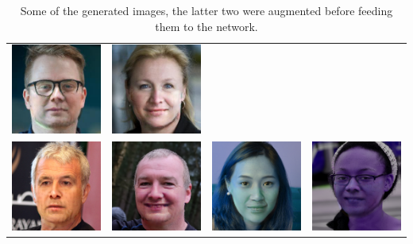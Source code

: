 \documentclass[10pt,twocolumn,letterpaper]{article}
\begin{document}
\begin{table}
\begin{tabular}{cccc}
    \includegraphics[width=.24\linewidth]{samples/00353.jpg}&
    \includegraphics[width=.24\linewidth]{samples/00708.jpg}\\
    \includegraphics[width=.24\linewidth]{samples/recon_600.png}&
    \includegraphics[width=.24\linewidth]{samples/recon_900.png}&
    \includegraphics[width=.24\linewidth]{samples/aug_recon_1600.png}&
    \includegraphics[width=.24\linewidth]{samples/aug_recon_200.png}\\
\end{tabular}
  \label{tab:photos}
  \caption{Some of the generated images, the latter two were augmented before
  feeding them to the network.}
\end{table}
\end{document}
